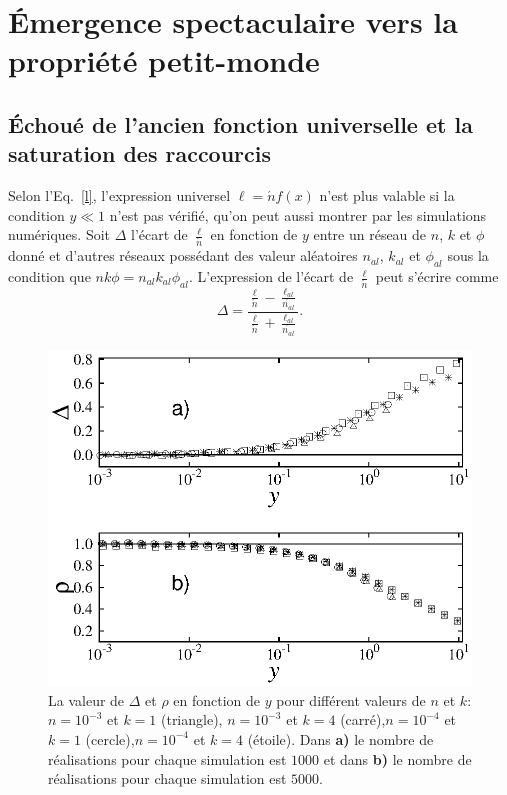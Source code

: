 \section{Émergence spectaculaire vers la propriété petit-monde}
\subsection{Échoué de l'ancien fonction universelle et la saturation des raccourcis}
Selon l'Eq.~\eqref{l}, l'expression universel $\ell=\acute{n}f(x)$
n'est plus valable si la condition $y\ll 1$ n'est pas vérifié, qu'on peut aussi montrer par les simulations numériques. Soit $\Delta$ l'écart de $\frac{\ell}{\acute{n}}$ en fonction
de $y$ entre un réseau de $n$, $k$ et $\phi$ donné et d'autres réseaux possédant des valeur aléatoires $n_{al}$, $k_{al}$ 
et $\phi_{al}$ sous la condition que $nk\phi=n_{al}k_{al}\phi_{al}$. L'expression de l'écart de $\frac{\ell}{\acute{n}}$  peut s'écrire  comme
\begin{equation}
\Delta=\frac{\frac{\ell}{\acute{n}}-\frac{\ell_{al}}{\acute{n_{al}}}}{\frac{\ell}{\acute{n}}+\frac{\ell_{al}}{\acute{n_{al}}}}.
\end{equation}

\begin{figure}[h!]
	\centering
	\includegraphics[scale=0.95,angle=0]{./figures/fig3-4}
	\caption{La valeur de $\Delta$ et $\rho$ en fonction de $y$ pour différent valeurs de $n$ et $k$:$n=10^{-3}$ et $k=1$ (triangle), $n=10^{-3}$ et	$k=4$ (carré),$n=10^{-4}$ et $k=1$ (cercle),$n=10^{-4}$ et $k=4$ (étoile). Dans   \textbf{a)} le nombre de réalisations pour chaque simulation est $1000$ et dans \textbf{b)} le nombre de réalisations pour chaque simulation est $5000$.}
	\label{def}
\end{figure}

